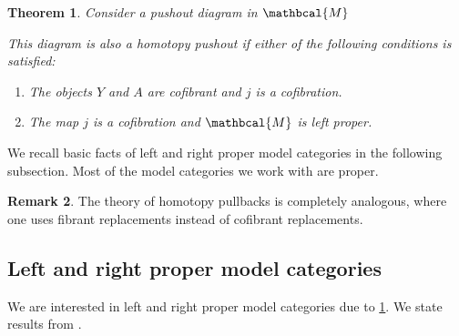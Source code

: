 \documentclass{scrartcl}
\theoremstyle{plain}
\newtheorem{theorem}{Theorem}[section]
\theoremstyle{definition}
\newtheorem{remark}[theorem]{Remark}
\newcommand{\cat}[1]{\mathbcal{#1}}
\newcommand{\from}{\leftarrow}
\DeclareMathOperator{\colim}{colim}
\begin{document}
\begin{theorem}\label{thm:homotopy_pushout_sufficient}
    Consider a pushout diagram in $\cat M$
    
    \begin{center}
    \end{center}

    This diagram is also a homotopy pushout if either of the following conditions is satisfied:
    \begin{enumerate}
        \item The objects $Y$ and $A$ are cofibrant and $j$ is a cofibration.
        \item The map $j$ is a cofibration and $\cat M$ is left proper.
    \end{enumerate}
\end{theorem}

We recall basic facts of left and right proper model categories in the following subsection. Most of the model categories we work with are proper. 

\begin{remark}
The theory of homotopy pullbacks is completely analogous, where one uses fibrant replacements instead of cofibrant replacements. 
\end{remark}


\subsection{Left and right proper model categories}
We are interested in left and right proper model categories due to \ref{thm:homotopy_pushout_sufficient}. We state results from \cite[15.4]{may2011more}.
\end{document}
